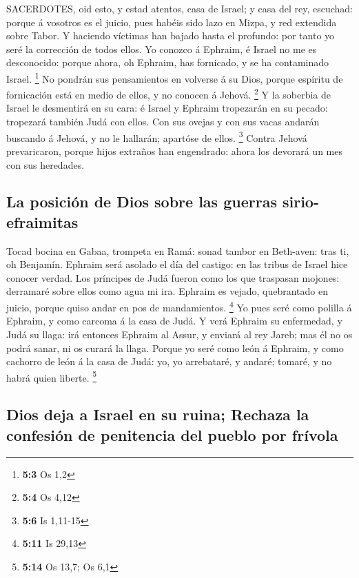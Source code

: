  SACERDOTES, oid esto, y estad atentos, casa de Israel; y
casa del rey, escuchad: porque á vosotros es el juicio, pues habéis sido
lazo en Mizpa, y red extendida sobre Tabor.  Y haciendo
víctimas han bajado hasta el profundo: por tanto yo seré la corrección
de todos ellos.  Yo conozco á Ephraim, é Israel no me es
desconocido: porque ahora, oh Ephraim, has fornicado, y se ha
contaminado Israel. \footnote{\textbf{5:3} Os 1,2}  No
pondrán sus pensamientos en volverse á su Dios, porque espíritu de
fornicación está en medio de ellos, y no conocen á Jehová. \footnote{\textbf{5:4}
  Os 4,12}  Y la soberbia de Israel le desmentirá en su
cara: é Israel y Ephraim tropezarán en su pecado: tropezará también Judá
con ellos.  Con sus ovejas y con sus vacas andarán buscando
á Jehová, y no le hallarán; apartóse de ellos. \footnote{\textbf{5:6} Is
  1,11-15}  Contra Jehová prevaricaron, porque hijos
extraños han engendrado: ahora los devorará un mes con sus heredades.

\hypertarget{la-posiciuxf3n-de-dios-sobre-las-guerras-sirio-efraimitas}{%
\subsection{La posición de Dios sobre las guerras
sirio-efraimitas}\label{la-posiciuxf3n-de-dios-sobre-las-guerras-sirio-efraimitas}}

 Tocad bocina en Gabaa, trompeta en Ramá: sonad tambor en
Beth-aven: tras ti, oh Benjamín.  Ephraim será asolado el
día del castigo: en las tribus de Israel hice conocer verdad.
 Los príncipes de Judá fueron como los que traspasan
mojones: derramaré sobre ellos como agua mi ira.  Ephraim
es vejado, quebrantado en juicio, porque quiso andar en pos de
mandamientos. \footnote{\textbf{5:11} Is 29,13}  Yo pues
seré como polilla á Ephraim, y como carcoma á la casa de Judá.
 Y verá Ephraim su enfermedad, y Judá su llaga: irá
entonces Ephraim al Assur, y enviará al rey Jareb; mas él no os podrá
sanar, ni os curará la llaga.  Porque yo seré como león á
Ephraim, y como cachorro de león á la casa de Judá: yo, yo arrebataré, y
andaré; tomaré, y no habrá quien liberte. \footnote{\textbf{5:14} Os
  13,7; Os 6,1}

\hypertarget{dios-deja-a-israel-en-su-ruina-rechaza-la-confesiuxf3n-de-penitencia-del-pueblo-por-fruxedvola}{%
\subsection{Dios deja a Israel en su ruina; Rechaza la confesión de
penitencia del pueblo por
frívola}\label{dios-deja-a-israel-en-su-ruina-rechaza-la-confesiuxf3n-de-penitencia-del-pueblo-por-fruxedvola}}

